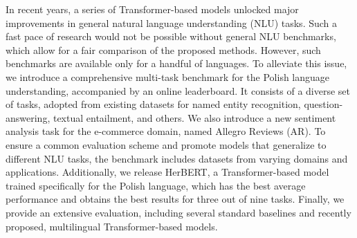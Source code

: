 In recent years, a series of Transformer-based models unlocked major improvements in general natural language understanding (NLU) tasks. Such a fast pace of research would not be possible without general NLU benchmarks, which allow for a fair comparison of the proposed methods. However, such benchmarks are available only for a handful of languages. To alleviate this issue, we introduce a comprehensive multi-task benchmark for the Polish language understanding, accompanied by an online leaderboard. It consists of a diverse set of tasks, adopted from existing datasets for named entity recognition, question-answering, textual entailment, and others. We also introduce a new sentiment analysis task for the e-commerce domain, named Allegro Reviews (AR). To ensure a common evaluation scheme and promote models that generalize to different NLU tasks, the benchmark includes datasets from varying domains and applications. Additionally, we release HerBERT, a Transformer-based model trained specifically for the Polish language, which has the best average performance and obtains the best results for three out of nine tasks. Finally, we provide an extensive evaluation, including several standard baselines and recently proposed, multilingual Transformer-based models.
